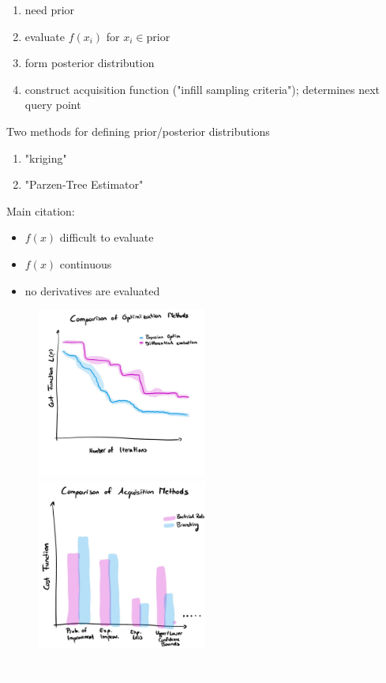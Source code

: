 \documentclass{article}
\newcommand{\todo}[1]{\colorbox{WildStrawberry}{\textcolor{white}{#1}}}
\begin{document}
\begin{enumerate}
    \item need prior
    \item evaluate $f(x_i)$ for $x_i\in\text{prior}$
    \item form posterior distribution 
    \item construct acquisition function ("infill sampling criteria"); determines next query point
\end{enumerate}

Two methods for defining prior/posterior distributions
\begin{enumerate}
    \item "kriging"
    \item "Parzen-Tree Estimator"
\end{enumerate}

Main citation: \cite{Jones1998}
\begin{itemize}
    \item $f(x)$ difficult to evaluate
    \item $f(x)$ continuous
    \item no derivatives are evaluated
\end{itemize}

\begin{figure}[H]
    \centering
    \includegraphics[width=0.5\textwidth]{figures/optim-cost-function-temp.jpg}%
    \includegraphics[width=0.5\textwidth]{figures/optim-acquisition-function-comparison.jpg}
    \caption{\todo{caption}}
    \label{fig:optim-comparison-cost-function}
\end{figure}
\end{document}
